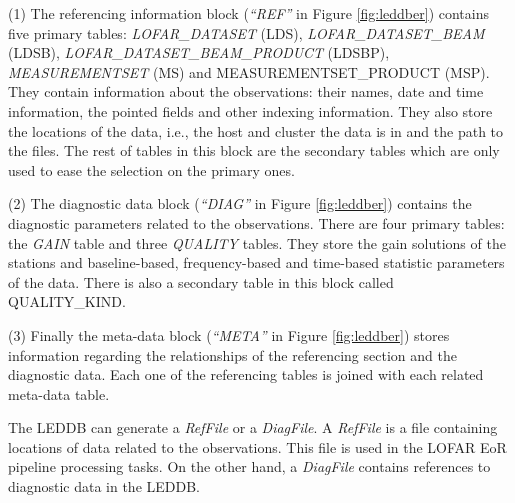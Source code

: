 (1) The referencing information block (\textit{``REF''} in Figure \ref{fig:leddber}) contains five primary tables: \textit{LOFAR\-\_DATA\-SET} (LDS), \textit{LOFAR\-\_DATA\-SET\-\_BEAM} (LDSB), \textit{LOFAR\-\_DATA\-SET\-\_BEAM\-\_PRODUCT} (LDSBP), \textit{MEA\-SU\-RE\-MENT\-SET} (MS) and {MEA\-SU\-RE\-MENT\-SET\-\_PRODUCT} (MSP). They contain information about the observations: their names, date and time information, the pointed fields and other indexing information. They also store the locations of the data, i.e., the host and cluster the data is in and the path to the files. The rest of tables in this block are the secondary tables which are only used to ease the selection on the primary ones.

(2) The diagnostic data block (\textit{``DIAG''} in Figure \ref{fig:leddber}) contains the diagnostic parameters related to the observations. There are four primary tables: the \textit{GAIN} table and three \textit{QUALITY} tables. They store the gain solutions of the stations and baseline-based, frequency-based and time-based statistic parameters of the data. There is also a secondary table in this block called QUA\-LI\-TY\-\_KIND.

(3) Finally the meta-data block (\textit{``META''} in Figure \ref{fig:leddber}) stores information regarding the relationships of the referencing section and the diagnostic data. Each one of the referencing tables is joined with each related meta-data table.

The LEDDB can generate a \textit{RefFile} or a \textit{DiagFile}. A \textit{RefFile} is a file containing locations of data related to the observations. This file is used in the LOFAR EoR pipeline processing tasks. On the other hand, a \textit{DiagFile} contains references to diagnostic data in the LEDDB.

